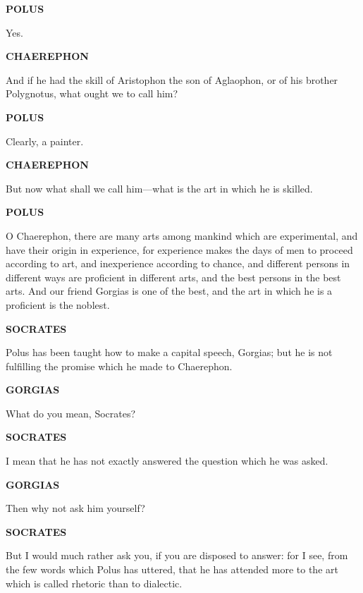 \documentclass[11pt,letter]{article}
\begin{document}
\par \textbf{POLUS}
\par   Yes.

\par \textbf{CHAEREPHON}
\par   And if he had the skill of Aristophon the son of Aglaophon, or of his brother Polygnotus, what ought we to call him?

\par \textbf{POLUS}
\par   Clearly, a painter.

\par \textbf{CHAEREPHON}
\par   But now what shall we call him—what is the art in which he is skilled.

\par \textbf{POLUS}
\par   O Chaerephon, there are many arts among mankind which are experimental, and have their origin in experience, for experience makes the days of men to proceed according to art, and inexperience according to chance, and different persons in different ways are proficient in different arts, and the best persons in the best arts. And our friend Gorgias is one of the best, and the art in which he is a proficient is the noblest.

\par \textbf{SOCRATES}
\par   Polus has been taught how to make a capital speech, Gorgias; but he is not fulfilling the promise which he made to Chaerephon.

\par \textbf{GORGIAS}
\par   What do you mean, Socrates?

\par \textbf{SOCRATES}
\par   I mean that he has not exactly answered the question which he was asked.

\par \textbf{GORGIAS}
\par   Then why not ask him yourself?

\par \textbf{SOCRATES}
\par   But I would much rather ask you, if you are disposed to answer:  for I see, from the few words which Polus has uttered, that he has attended more to the art which is called rhetoric than to dialectic.
\end{document}
